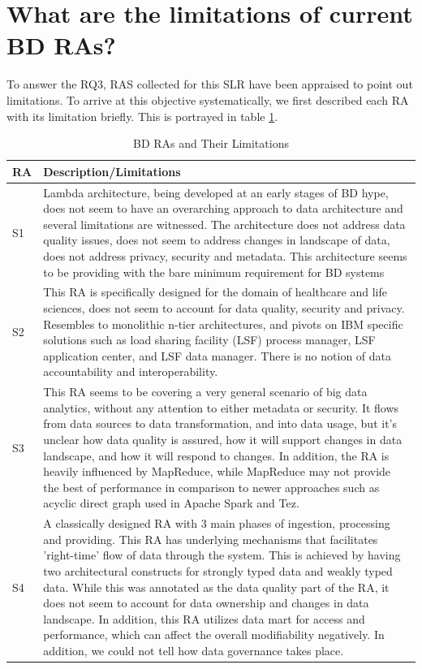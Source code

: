 \documentclass{ieeeaccess}
\begin{document}
\section{What are the limitations of current BD RAs?}

To answer the RQ3, RAS collected for this SLR have been appraised to point out limitations. To arrive at this objective systematically, we first described each RA with its limitation briefly. This is portrayed in table \ref{table:BD-RAs-Limitations}.


\begin{table}
    \caption{BD RAs and Their Limitations}
    \renewcommand*{\arraystretch}{1.4}
    \label{table:BD-RAs-Limitations}
    \begin{tabular}{|p{0.3cm}|p{16.8cm}|}
        \hline
        RA & Description/Limitations \\ 
        \hline
        S1 & Lambda architecture, being developed at an early stages of BD hype, does not seem to have an overarching approach to data architecture and several limitations are witnessed. The architecture does not address data quality issues, does not seem to address changes in landscape of data, does not address privacy, security and metadata. This architecture seems to be providing with the bare minimum requirement for BD systems  \\
        \hline
        S2 & This RA is specifically designed for the domain of healthcare and life sciences, does not seem to account for data quality, security and privacy. Resembles to monolithic n-tier architectures, and pivots on IBM specific solutions such as load sharing facility (LSF) process manager, LSF application center, and LSF data manager. There is no notion of data accountability and interoperability. \\
        \hline
        S3 & This RA seems to be covering a very general scenario of big data analytics, without any attention to either metadata or security. It flows from data sources to data transformation, and into data usage, but it's unclear how data quality is assured, how it will support changes in data landscape, and how it will respond to changes. In addition, the RA is heavily influenced by MapReduce, while MapReduce may not provide the best of performance in comparison to newer approaches such as acyclic direct graph used in Apache Spark and Tez.  \\
        \hline
        S4 & A classically designed RA with 3 main phases of ingestion, processing and providing. This RA has underlying mechanisms that facilitates 'right-time' flow of data through the system. This is achieved by having two architectural constructs for strongly typed data and weakly typed data. While this was annotated as the data quality part of the RA, it does not seem to account for data ownership and changes in data landscape. In addition, this RA utilizes data mart for access and performance, which can affect the overall modifiability negatively. In addition, we could not tell how data governance takes place.  \\

\end{tabular}
\end{table}
\end{document}
